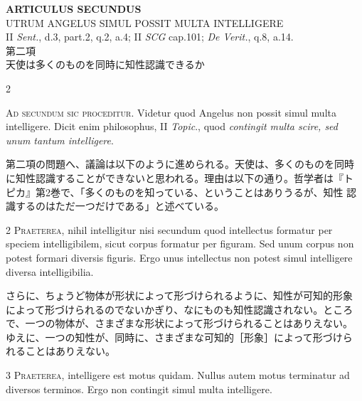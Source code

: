 \documentclass[paper=a4paper,fontsize=10pt,jafontsize=9pt,titlepage]{jlreq}
\begin{document}
\newpage


\newpage
{}
{}
\setcounter{section}{2}
\setcounter{subsection}{0}
\begin{center}
{\Large {\bfseries ARTICULUS SECUNDUS}}\\
{\large UTRUM ANGELUS SIMUL POSSIT MULTA INTELLIGERE}\\
{\footnotesize II {\itshape Sent.}, d.3, part.2, q.2, a.4; II {\itshape
SCG} cap.101; {\itshape De Verit.}, q.8, a.14.}\\
{\Large 第二項\\天使は多くのものを同時に知性認識できるか}
\end{center}

\begin{paracol}{2}

{\Huge A}{\scshape d secundum sic proceditur}. Videtur quod
Angelus non possit simul multa intelligere. Dicit enim philosophus, II
{\itshape Topic}., quod {\itshape contingit multa scire, sed unum tantum intelligere}.

\switchcolumn

第二項の問題へ、議論は以下のように進められる。天使は、多くのものを同時
に知性認識することができないと思われる。理由は以下の通り。哲学者は『ト
ピカ』第2巻で、「多くのものを知っている、ということはありうるが、知性
認識するのはただ一つだけである」と述べている。

\switchcolumn*

{\scshape 2 Praeterea}, nihil intelligitur nisi secundum
quod intellectus formatur per speciem intelligibilem, sicut corpus
formatur per figuram. Sed unum corpus non potest formari diversis
figuris. Ergo unus intellectus non potest simul intelligere diversa
intelligibilia.

\switchcolumn

さらに、ちょうど物体が形状によって形づけられるように、知性が可知的形象
によって形づけられるのでないかぎり、なにものも知性認識されない。ところ
で、一つの物体が、さまざまな形状によって形づけられることはありえない。
ゆえに、一つの知性が、同時に、さまざまな可知的［形象］によって形づけら
れることはありえない。

\switchcolumn*

{\scshape 3 Praeterea}, intelligere est motus
quidam. Nullus autem motus terminatur ad diversos terminos. Ergo non
contingit simul multa intelligere.

\switchcolumn


\end{paracol}
\end{document}
